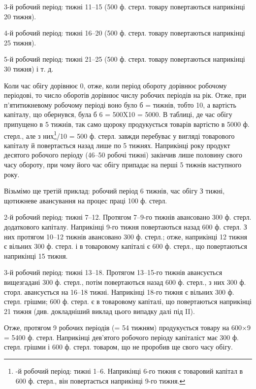 3-й робочий період: тижні 11--15 (500 ф. стерл. товару повертаються
наприкінці 20 тижня).

4-й робочий період: тижні 16--20 (500 ф. стерл. товару повертаються
наприкінці 25 тижня).

5-й робочий період: тижні 21--25 (500 ф. стерл. товару повертаються
наприкінці 30 тижня) і т. д.

Коли час обігу дорівнює 0, отже, коли період обороту дорівнює
робочому періодові, то число оборотів дорівнює числу робочих періодів
на рік.
Отже, при п’ятитижневому робочому періоді воно було б = 
тижнів, тобто 10, а вартість капіталу, що обернувся, була б 6 = 500X10 =
5000.
В таблиці, де час обігу припущено в 5 тижнів, так само щороку
продукується товарів вартістю в 5000 ф. стерл., але з них\footnote{
-й робочий період: тижні 1--6. Наприкінці 6-го тижня є товаровий
капітал в 600 ф. стерл., він повертається наприкінці 9-го тижня.
}/10 = 500 ф.
стерл. завжди перебуває у вигляді товарового капіталу й повертається
назад лише по 5 тижнях. Наприкінці року продукт десятого робочого
періоду (46--50 робочі тижні) закінчив лише половину свого часу
обороту, при чому його час обігу припадає на перші 5 тижнів наступного року.

Візьмімо ще третій приклад: робочий період 6 тижнів, час обігу
З тижні, щотижневе авансування на процес праці 100 ф. стерл.

2-й робочий період: тижні 7--12. Протягом 7--9-го тижнів авансовано
300 ф. стерл. додаткового капіталу. Наприкінці 9-го тижня повертаються
назад 600 ф. стерл. З них протягом 10--12 тижнів авансовано 300 ф.
стерл.; отже, наприкінці 12 тижня є вільних 300 ф. стерл. і в товаровому
капіталі є 600 ф. стерл., що повертаються наприкінці 15 тижня.

3-й робочий період: тижні 13--18. Протягом 13--15-го тижнів авансується
вищезгадані 300 ф. стерл., потім повертаються назад 600 ф. стерл.,
з них 300 ф. сторл. авансується на 16--18 тижні. Наприкінці 18-го тижня
є вільних 300 ф. стерл. грішми; 600 ф. стерл. є в товаровому капіталі,
що повертаються наприкінці 21 тижня (див. докладніший виклад
цього випадку далі під II).

Отже, протягом 9 робочих періодів (= 54 тижням) продукується товару
на 600×9 = 5400 ф. стерл. Наприкінці дев’ятого робочого періоду
капіталіст має 300 ф. стерл. грішми і 600 ф. стерл. товаром, що не
проробив ще свого часу обігу.

